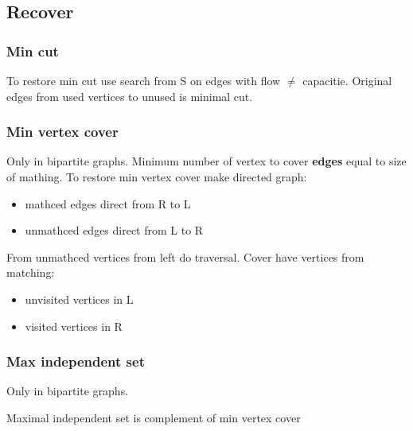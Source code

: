 \subsection{Recover}
\subsubsection{Min cut}
To restore min cut use search from S on edges with flow $\ne$ capacitie.
Original edges from used vertices to unused is minimal cut.
\subsubsection{Min vertex cover}
Only in bipartite graphs.
Minimum number of vertex to cover \textbf{edges} equal to size of mathing.
To restore min vertex cover make directed graph:
\begin{itemize}
\item mathced edges direct from R to L
\item unmathced edges direct from L to R
\end{itemize}
From unmathced vertices from left do traversal.
Cover have vertices from matching:
\begin{itemize}
\item unvisited vertices in L 
\item visited vertices in R
\end{itemize}

\subsubsection{Max independent set}
Only in bipartite graphs.

Maximal independent set is complement of min vertex cover

